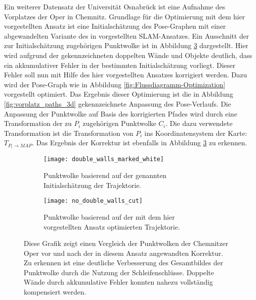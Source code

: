 Ein weiterer Datensatz der Universität Osnabrück ist eine Aufnahme des Vorplatzes der Oper in Chemnitz. Grundlage für die Optimierung mit dem hier vorgestellten Ansatz ist eine Initialschätzung des Pose-Graphen mit einer abgewandelten Variante des in \cite{zhang2014loam} vorgestellten SLAM-Ansatzes. Ein Ausschnitt der zur Initialschätzung zugehörigen Punktwolke ist in Abbildung \ref{fig:chemnitz_double_walls} dargestellt. Hier wird aufgrund der gekennzeichneten doppelten Wände und Objekte deutlich, dass ein akkumulativer Fehler in der bestimmten Initialschätzung vorliegt. Dieser Fehler soll nun mit Hilfe des hier vorgestellten Ansatzes korrigiert werden. Dazu wird der Pose-Graph wie in Abbildung \ref{fig:Flussdiagramm-Optimization} vorgestellt optimiert. Das Ergebnis dieser Optimierung ist die in Abbildung \ref{fig:vorplatz_paths_3d} gekennzeichnete Anpassung des Pose-Verlaufs. Die Anpassung der Punktwolke auf Basis des korrigierten Pfades wird durch eine Transformation der zu $P_i$ zugehörigen Punktwolke $C_i$. Die dazu verwendete Transformation ist die Transformation von $P_i$ ins Koordinatensystem der Karte: $T_{P_i \rightarrow MAP}$. Das Ergebnis der Korrektur ist ebenfalls in Abbildung \ref{fig:chemnitz_double_walls} zu erkennen.

\begin{figure}
	\centering
	\begin{subfigure}{.5\textwidth}
		 \centering
  		 \texttt{[image: double\_walls\_marked\_white]}
  		 \centering \caption{Punktwolke basierend auf der genannten Initialschätzung der Trajektorie.}
  		 \label{fig:double_walls_marked}
	\end{subfigure}%
	\begin{subfigure}{.5\textwidth}
    	\centering
  		\texttt{[image: no\_double\_walls\_cut]}
  		\centering \caption{Punktwolke basierend auf der mit dem hier vorgestellten Ansatz optimierten Trajektorie.}
  		\label{fig:no_double_walls_cut}
	\end{subfigure}
	\caption{Diese Grafik zeigt einen Vergleich der Punktwolken der Chemnitzer Oper vor und nach der in diesem Ansatz angewandten Korrektur. Zu erkennen ist eine deutliche Verbesserung des Gesamtbildes der Punktwolke durch die Nutzung der Schleifenschlüsse. Doppelte Wände durch akkumulative Fehler konnten nahezu vollständig kompensiert werden.}
	\label{fig:chemnitz_double_walls}
\end{figure}

